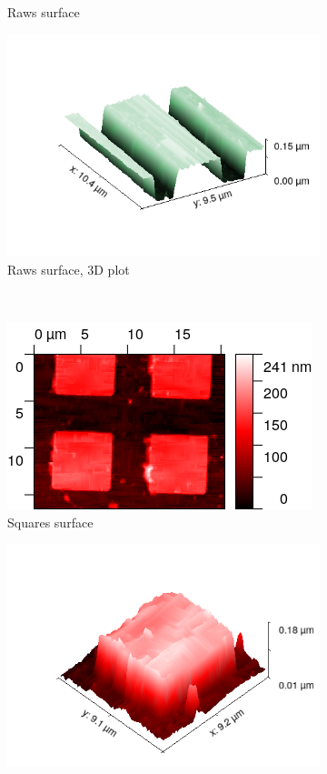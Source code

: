 \documentclass[11pt,a4paper]{article}
\begin{document}
\begin{figure}[H]
\begin{subfigure}[b]{0.42\textwidth}
\caption{Raws surface}
\label{fig:}
\end{subfigure}
\begin{subfigure}[b]{0.42\textwidth}
\includegraphics[width=\textwidth]{tm_raws_3D}
\caption{Raws surface, 3D plot}
\label{fig:}
\end{subfigure}\\\vspace{.2cm}
\begin{subfigure}[b]{0.42\textwidth}
\includegraphics[width=\textwidth]{tm_squares}
\caption{Squares surface}
\label{fig:}
\end{subfigure}
\begin{subfigure}[b]{0.42\textwidth}
\includegraphics[width=\textwidth]{tm_squares_3D}

\end{subfigure}
\end{figure}
\end{document}
